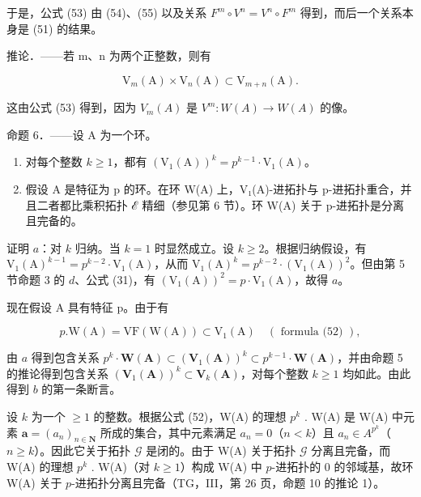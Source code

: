 于是，公式 (53) 由 (54)、(55) 以及关系 \(F^{m} \circ V^{n} = V^{n} \circ F^{m}\) 得到，而后一个关系本身是 (51) 的结果。

推论．——若 m、n 为两个正整数，则有

\[
\mathrm{V} _ {m} (\mathrm{A}) \times \mathrm{V} _ {n} (\mathrm{A}) \subset \mathrm{V} _ {m + n} (\mathrm{A}).
\]

这由公式 (53) 得到，因为 \(V_{m}(A)\) 是 \(V^{m}:W(A)\to W(A)\) 的像。

命题 6．——设 A 为一个环。

\begin{enumerate}
\def\labelenumi{\alph{enumi})}
\item
  对每个整数 \(k \geqslant 1\)，都有 \((\mathrm{V}_1(\mathrm{A}))^k = p^{k-1} \cdot \mathrm{V}_1(\mathrm{A})\)。
\item
  假设 A 是特征为 p 的环。在环 W(A) 上，V₁(A)-进拓扑与 p-进拓扑重合，并且二者都比乘积拓扑 ℰ 精细（参见第 6 节）。环 W(A) 关于 p-进拓扑是分离且完备的。
\end{enumerate}

证明 \(a\)：对 \(k\) 归纳。当 \(k = 1\) 时显然成立。设 \(k \geqslant 2\)。根据归纳假设，有 \(\mathrm{V}_{1}(\mathrm{A})^{k-1} = p^{k-2} \cdot \mathrm{V}_{1}(\mathrm{A})\)，从而 \(\mathrm{V}_{1}(\mathrm{A})^{k} = p^{k-2} \cdot (\mathrm{V}_{1}(\mathrm{A}))^{2}\)。但由第 5 节命题 3 的 \(d\)、公式 (31)，有 \((\mathrm{V}_{1}(\mathrm{A}))^{2} = p \cdot \mathrm{V}_{1}(\mathrm{A})\)，故得 \(a\)。

现在假设 A 具有特征 p。由于有

\[
p. \mathrm{W} (\mathrm{A}) = \mathrm{VF} (\mathrm{W} (\mathrm{A})) \subset \mathrm{V} _ {1} (\mathrm{A}) \quad (\text { formula (52) }),
\]

由 \(a\) 得到包含关系 \(p^{k} \cdot \mathbf{W}(\mathbf{A}) \subset (\mathbf{V}_{1}(\mathbf{A}))^{k} \subset p^{k-1} \cdot \mathbf{W}(\mathbf{A})\)，并由命题 5 的推论得到包含关系 \((\mathbf{V}_{1}(\mathbf{A}))^{k} \subset \mathbf{V}_{k}(\mathbf{A})\)，对每个整数 \(k \geqslant 1\) 均如此。由此得到 \(b\) 的第一条断言。

设 \(k\) 为一个 \(\geqslant 1\) 的整数。根据公式 (52)，W(A) 的理想 \(p^{k}\) . W(A) 是 W(A) 中元素 \(\boldsymbol{a} = (a_{n})_{n \in \mathbf{N}}\) 所成的集合，其中元素满足 \(a_{n} = 0\)（\(n < k\)）且 \(a_{n} \in A^{p^{k}}\)（\(n \geqslant k\)）。因此它关于拓扑 \(\mathcal{G}\) 是闭的。由于 W(A) 关于拓扑 \(\mathcal{G}\) 分离且完备，而 W(A) 的理想 \(p^{k}\) . W(A)（对 \(k \geqslant 1\)）构成 W(A) 中 \(p\)-进拓扑的 0 的邻域基，故环 W(A) 关于 \(p\)-进拓扑分离且完备（TG，III，第 26 页，命题 10 的推论 1）。

